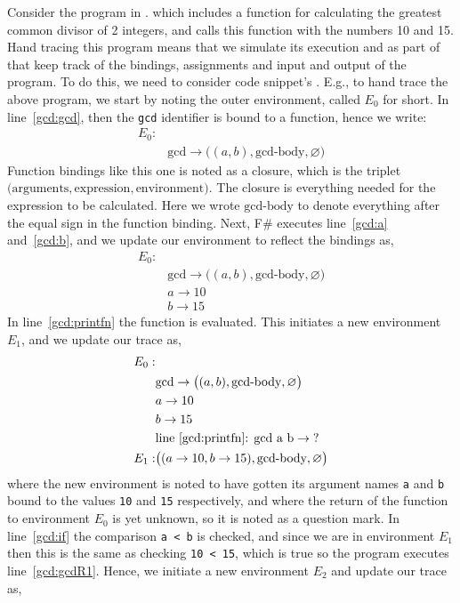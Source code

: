 Consider the program in . 
%
%
which includes a function for calculating the greatest common divisor of 2 integers, and calls this function with the numbers 10 and 15. Hand tracing this program means that we simulate its execution and as part of that keep track of the bindings, assignments and input and output of the program. To do this, we need to consider code snippet's . E.g., to hand trace the above program, we start by noting the outer environment, called $E_0$ for short. In line~\ref{gcd:gcd}, then the \lstinline!gcd! identifier is bound to a function, hence we write:
\begin{align*}
  E_0:&\\
  & \text{gcd} \rightarrow \big((a, b), \text{gcd-body}, \varnothing\big)
\end{align*}
Function bindings like this one is noted as a closure, which is the triplet $\big(\text{arguments}, \text{expression}, \text{environment}\big)$. The closure is everything needed for the expression to be calculated. Here we wrote $\text{gcd-body}$ to denote everything after the equal sign in the function binding. Next, F\# executes line~\ref{gcd:a} and~\ref{gcd:b}, and we update our environment to reflect the bindings as, 
\begin{align*}
  E_0:&\\
  & \text{gcd} \rightarrow \big((a, b), \text{gcd-body}, \varnothing\big)\\
  & a \rightarrow 10\\
  & b \rightarrow 15
\end{align*}
In line~\ref{gcd:printfn} the function is evaluated. This initiates a new environment $E_1$, and we update our trace as,
\begin{align*}
  E_0:&\\
      & \text{gcd} \rightarrow \big((a, b), \text{gcd-body}, \varnothing\big)\\
      & a \rightarrow 10\\
      & b \rightarrow 15\\
      & \text{line~\ref{gcd:printfn}: gcd a b} \rightarrow \text{?}\\
  E_1:& \big((a \rightarrow 10, b \rightarrow 15), \text{gcd-body}, \varnothing\big)\\
\end{align*}
where the new environment is noted to have gotten its argument names \lstinline!a! and \lstinline!b! bound to the values \lstinline!10! and \lstinline!15! respectively, and where the return of the function to environment $E_0$ is yet unknown, so it is noted as a question mark. In line~\ref{gcd:if} the comparison \lstinline!a < b! is checked, and since we are in environment $E_1$ then this is the same as checking \lstinline!10 < 15!, which is true so the program executes line~\ref{gcd:gcdR1}. Hence, we initiate a new environment $E_2$ and update our trace as,
